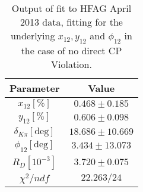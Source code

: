 \begin{table}[htdp]

\begin{center}
\begin{tabular}{|c||c|}
\hline
Parameter & Value  \\ \hline

$x_{12}[\%] $&$0.468\pm 0.185$\\ \hline

$y_{12}[\%] $&$0.606\pm 0.098$\\ \hline

$\delta_{K\pi}[\text{deg}]$&$18.686\pm 10.669$\\ \hline

$\phi_{12}[\text{deg}]$&$3.434\pm 13.073$\\ \hline

$R_D[10^{-3}]$&$3.720\pm 0.075$\\ \hline

$\chi^2/ndf$ &$22.263/24$ \\ \hline

\end{tabular}
\end{center}
\caption{Output of fit to HFAG April 2013 data, fitting for the underlying $x_{12},y_{12}$ and $\phi_{12}$ in the case
of no direct CP Violation.}
\label{table:hfag_2013_april_table_12}
\end{table}%
